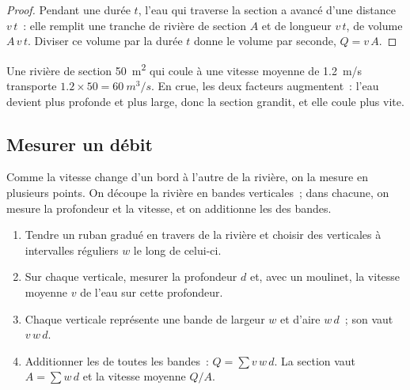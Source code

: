 \begin{proof}
Pendant une durée $t$, l'eau qui traverse la section a avancé d'une
distance $v\,t$~: elle remplit une tranche de rivière de section $A$ et de
longueur $v\,t$, de volume $A\,v\,t$. Diviser ce volume par la durée $t$
donne le volume par seconde, $Q = v\,A$.
\end{proof}

Une rivière de section \qty{50}{m^2} qui coule à une vitesse moyenne de
\qty{1.2}{m/s} transporte $1.2 \times 50 = \qty{60}{m^3/s}$. En crue, les
deux facteurs augmentent~: l'eau devient plus profonde et plus large, donc
la section grandit, et elle coule plus vite.

\subsection*{Mesurer un débit}

Comme la vitesse change d'un bord à l'autre de la rivière, on la mesure en
plusieurs points. On découpe la rivière en bandes verticales~; dans chacune,
on mesure la profondeur et la vitesse, et on additionne les  des
bandes.

\begin{method}\label{met:g10:drainage-basins:velocity-area}
\begin{enumerate}
  \item Tendre un ruban gradué en travers de la rivière et choisir des
        verticales à intervalles réguliers $w$ le long de celui-ci.
  \item Sur chaque verticale, mesurer la profondeur $d$ et, avec un
        moulinet, la vitesse moyenne $v$ de l'eau sur cette profondeur.
  \item Chaque verticale représente une bande de largeur $w$ et d'aire
        $w\,d$~; son  vaut $v\,w\,d$.
  \item Additionner les  de toutes les bandes~: $Q = \sum v\,w\,d$.
        La section vaut $A = \sum w\,d$ et la vitesse moyenne $Q/A$.
\end{enumerate}
\end{method}

